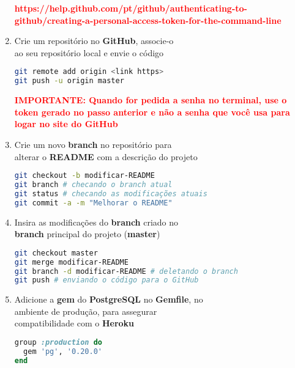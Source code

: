 \documentclass[a4paper,12pt]{article}
\begin{document}
\begin{enumerate}
  \textcolor{red}{\textbf{\footnotesize https://help.github.com/pt/github/authenticating-to-github/creating-a-personal-access-token-for-the-command-line}}

  \item Crie um repositório no \textbf{GitHub}, associe-o \\
        ao seu repositório local e envie o código

    \begin{lstlisting}[language=Bash]
git remote add origin <link https>
git push -u origin master
    \end{lstlisting}

  \textcolor{red}{\textbf{IMPORTANTE: Quando for pedida a senha no terminal, use o token gerado no passo anterior e não a senha que você usa para logar no site do GitHub}}

  \item Crie um novo \textbf{branch} no repositório para \\
        alterar o \textbf{README} com a descrição do projeto

    \begin{lstlisting}[language=Bash, commentstyle=\color{gray}]
git checkout -b modificar-README
git branch # checando o branch atual
git status # checando as modificações atuais
git commit -a -m "Melhorar o README"
    \end{lstlisting}

  \item Insira as modificações do \textbf{branch} criado no \\
        \textbf{branch} principal do projeto (\textbf{master})

    \begin{lstlisting}[language=Bash, commentstyle=\color{gray}]
git checkout master
git merge modificar-README
git branch -d modificar-README # deletando o branch
git push # enviando o código para o GitHub
    \end{lstlisting}

  \item Adicione a \textbf{gem} do \textbf{PostgreSQL} no \textbf{Gemfile}, no \\
        ambiente de produção, para assegurar \\
        compatibilidade com o \textbf{Heroku}

    \begin{lstlisting}[language=Ruby, title=Gemfile]
group :production do
  gem 'pg', '0.20.0'
end
    \end{lstlisting}


\end{enumerate}
\end{document}
